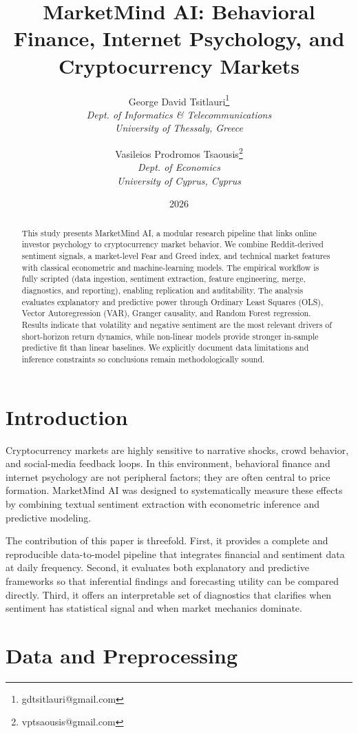 \documentclass[12pt]{article}
\title{MarketMind AI: Behavioral Finance, Internet Psychology, and Cryptocurrency Markets}
\author{
George David Tsitlauri\thanks{gdtsitlauri@gmail.com}\\
\textit{Dept. of Informatics \& Telecommunications}\\
\textit{University of Thessaly, Greece}
\and
Vasileios Prodromos Tsaousis\thanks{vptsaousis@gmail.com}\\
\textit{Dept. of Economics}\\
\textit{University of Cyprus, Cyprus}
}
\date{2026}
\begin{document}
\maketitle

\begin{abstract}
This study presents MarketMind AI, a modular research pipeline that links online investor psychology to cryptocurrency market behavior. We combine Reddit-derived sentiment signals, a market-level Fear and Greed index, and technical market features with classical econometric and machine-learning models. The empirical workflow is fully scripted (data ingestion, sentiment extraction, feature engineering, merge, diagnostics, and reporting), enabling replication and auditability. The analysis evaluates explanatory and predictive power through Ordinary Least Squares (OLS), Vector Autoregression (VAR), Granger causality, and Random Forest regression. Results indicate that volatility and negative sentiment are the most relevant drivers of short-horizon return dynamics, while non-linear models provide stronger in-sample predictive fit than linear baselines. We explicitly document data limitations and inference constraints so conclusions remain methodologically sound.
\end{abstract}

\section{Introduction}
Cryptocurrency markets are highly sensitive to narrative shocks, crowd behavior, and social-media feedback loops. In this environment, behavioral finance and internet psychology are not peripheral factors; they are often central to price formation. MarketMind AI was designed to systematically measure these effects by combining textual sentiment extraction with econometric inference and predictive modeling.

The contribution of this paper is threefold. First, it provides a complete and reproducible data-to-model pipeline that integrates financial and sentiment data at daily frequency. Second, it evaluates both explanatory and predictive frameworks so that inferential findings and forecasting utility can be compared directly. Third, it offers an interpretable set of diagnostics that clarifies when sentiment has statistical signal and when market mechanics dominate.

\section{Data and Preprocessing}
\end{document}
